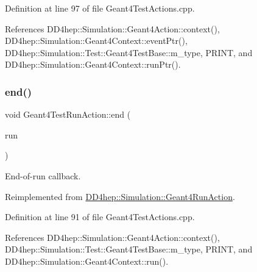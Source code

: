 Definition at line 97 of file Geant4\+Test\+Actions.\+cpp.



References D\+D4hep\+::\+Simulation\+::\+Geant4\+Action\+::context(), D\+D4hep\+::\+Simulation\+::\+Geant4\+Context\+::event\+Ptr(), D\+D4hep\+::\+Simulation\+::\+Test\+::\+Geant4\+Test\+Base\+::m\+\_\+type, P\+R\+I\+NT, and D\+D4hep\+::\+Simulation\+::\+Geant4\+Context\+::run\+Ptr().

\hypertarget{class_d_d4hep_1_1_simulation_1_1_test_1_1_geant4_test_run_action_a9cffefeecef4c952ad1fbbc80893aac8}{}\label{class_d_d4hep_1_1_simulation_1_1_test_1_1_geant4_test_run_action_a9cffefeecef4c952ad1fbbc80893aac8} 
\subsubsection{\texorpdfstring{end()}{end()}}
{\footnotesize\ttfamily void Geant4\+Test\+Run\+Action\+::end (\begin{DoxyParamCaption}\item[{const G4\+Run $\ast$}]{run }\end{DoxyParamCaption})\hspace{0.3cm}{\ttfamily [virtual]}}



End-\/of-\/run callback. 



Reimplemented from \hyperlink{class_d_d4hep_1_1_simulation_1_1_geant4_run_action_a71c7dbfb3451a9d6cc594f0174a631a2}{D\+D4hep\+::\+Simulation\+::\+Geant4\+Run\+Action}.



Definition at line 91 of file Geant4\+Test\+Actions.\+cpp.



References D\+D4hep\+::\+Simulation\+::\+Geant4\+Action\+::context(), D\+D4hep\+::\+Simulation\+::\+Test\+::\+Geant4\+Test\+Base\+::m\+\_\+type, P\+R\+I\+NT, and D\+D4hep\+::\+Simulation\+::\+Geant4\+Context\+::run().

\hypertarget{class_d_d4hep_1_1_simulation_1_1_test_1_1_geant4_test_run_action_ae93d60ada35540e3801472025ff23ded}{}\label{class_d_d4hep_1_1_simulation_1_1_test_1_1_geant4_test_run_action_ae93d60ada35540e3801472025ff23ded} 
